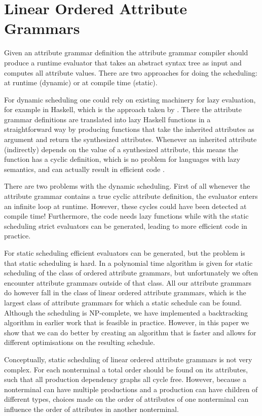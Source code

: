 \documentclass{llncs}
\begin{document}
\section{Linear Ordered Attribute Grammars} \label{sect:loag}
Given an attribute grammar definition the attribute grammar compiler should produce a runtime evaluator that takes an abstract syntax tree as input and computes all attribute values. There are two approaches for doing the scheduling: at runtime (dynamic) or at compile time (static).

For dynamic scheduling one could rely on existing machinery for lazy evaluation, for example in Haskell, which is the approach taken by \cite{saraiva99}. There the attribute grammar definitions are translated into lazy Haskell functions in a straightforward way by producing functions that take the inherited attributes as argument and return the synthesized attributes. Whenever an inherited attribute (indirectly) depends on the value of a synthesized attribute, this means the function has a cyclic definition, which is no problem for languages with lazy semantics, and can actually result in efficient code \cite{Bird:1984}.

There are two problems with the dynamic scheduling. First of all whenever the attribute grammar contains a true cyclic attribute definition, the evaluator enters an infinite loop at runtime. However, these cycles could have been detected at compile time! Furthermore, the code needs lazy functions while with the static scheduling strict evaluators can be generated, leading to more efficient code in practice.

For static scheduling efficient evaluators can be generated, but the problem is that static scheduling is hard. In \cite{kastens80} a polynomial time algorithm is given for static scheduling of the class of ordered attribute grammars, but unfortunately we often encounter attribute grammars outside of that class. All our attribute grammars do however fall in the class of linear ordered attribute grammars, which is the largest class of attribute grammars for which a static schedule can be found. Although the scheduling is NP-complete, we have implemented a backtracking algorithm in earlier work \cite{Binsbergen:2015} that is feasible in practice. However, in this paper we show that we can do better by creating an algorithm that is faster and allows for different optimisations on the resulting schedule.

Conceptually, static scheduling of linear ordered attribute grammars is not very complex. For each nonterminal a total order should be found on its attributes, such that all production dependency graphs all cycle free. However, because a nonterminal can have multiple productions and a production can have children of different types, choices made on the order of attributes of one nonterminal can influence the order of attributes in another nonterminal.
\end{document}
